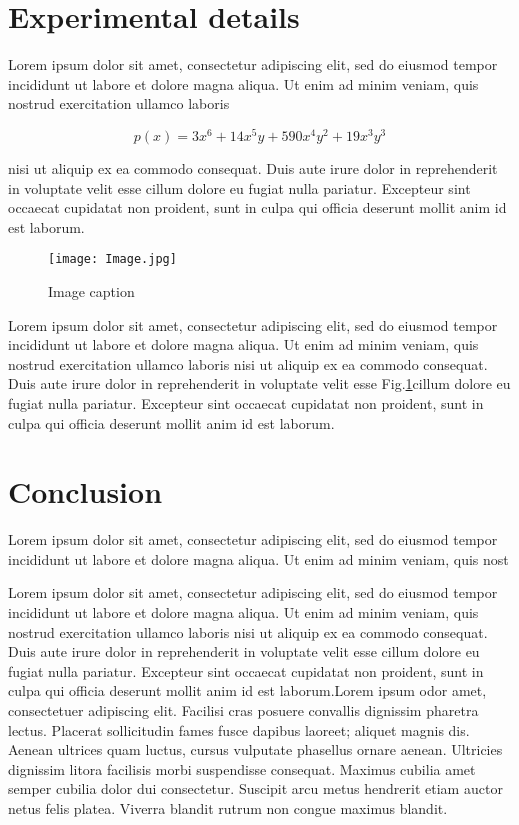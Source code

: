 \documentclass[final,3p,times,twocolumn]{elsarticle}
\begin{document}
\section{Experimental details}

Lorem ipsum dolor sit amet, consectetur adipiscing elit, sed do eiusmod tempor incididunt ut labore et dolore magna aliqua. Ut enim ad minim veniam, quis nostrud exercitation ullamco laboris

\begin{equation}
p(x) = 3x^6 + 14x^5y + 590x^4y^2 + 19x^3y^3
\end{equation}

nisi ut aliquip ex ea commodo consequat. Duis aute irure dolor in reprehenderit in voluptate velit esse cillum dolore eu fugiat nulla pariatur. Excepteur sint occaecat cupidatat non proident, sunt in culpa qui officia deserunt mollit anim id est laborum.
\begin{figure}
\centering
\texttt{[image: Image.jpg]}
\caption{Image caption}
\label{Fig:Image1}
\end{figure}   

Lorem ipsum dolor sit amet, consectetur adipiscing elit, sed do eiusmod tempor incididunt ut labore et dolore magna aliqua. Ut enim ad minim veniam, quis nostrud exercitation ullamco laboris nisi ut aliquip ex ea commodo consequat. Duis aute irure dolor in reprehenderit in voluptate velit esse Fig.\ref{Fig:Image1}cillum dolore eu fugiat nulla pariatur. Excepteur sint occaecat cupidatat non proident, sunt in culpa qui officia deserunt mollit anim id est laborum.

\section{Conclusion}

Lorem ipsum dolor sit amet, consectetur adipiscing elit, sed do eiusmod tempor incididunt ut labore et dolore magna aliqua. Ut enim ad minim veniam, quis nost

Lorem ipsum dolor sit amet, consectetur adipiscing elit, sed do eiusmod tempor incididunt ut labore et dolore magna aliqua. Ut enim ad minim veniam, quis nostrud exercitation ullamco laboris nisi ut aliquip ex ea commodo consequat. Duis aute irure dolor in reprehenderit in voluptate velit esse cillum dolore eu fugiat nulla pariatur. Excepteur sint occaecat cupidatat non proident, sunt in culpa qui officia deserunt mollit anim id est laborum.Lorem ipsum odor amet, consectetuer adipiscing elit. Facilisi cras posuere convallis dignissim pharetra lectus. Placerat sollicitudin fames fusce dapibus laoreet; aliquet magnis dis. Aenean ultrices quam luctus, cursus vulputate phasellus ornare aenean. Ultricies dignissim litora facilisis morbi suspendisse consequat. Maximus cubilia amet semper cubilia dolor dui consectetur. Suscipit arcu metus hendrerit etiam auctor netus felis platea. Viverra blandit rutrum non congue maximus blandit.
\end{document}
